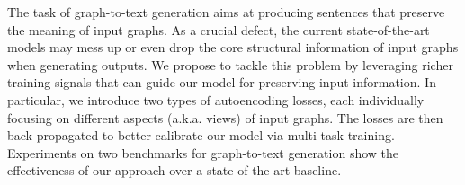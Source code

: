 The task of graph-to-text generation aims at producing sentences that preserve the meaning of input graphs. As a crucial defect, the current state-of-the-art models may mess up or even drop the core structural information of input graphs when generating outputs. We propose to tackle this problem by leveraging richer training signals that can guide our model for preserving input information. In particular, we introduce two types of autoencoding losses, each individually focusing on different aspects (a.k.a. views) of input graphs. The losses are then back-propagated to better calibrate our model via multi-task training. Experiments on two benchmarks for graph-to-text generation show the effectiveness of our approach over a state-of-the-art baseline.
